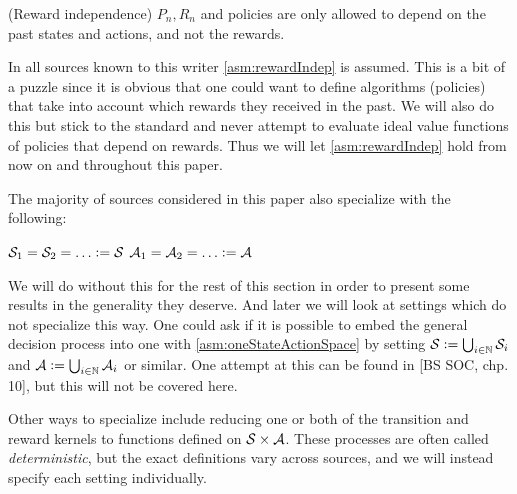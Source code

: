 \begin{asm}(Reward independence)
  $P_n, R_n$ and policies are only allowed to depend on the past
  states and actions, and not the rewards.
  \label{asm:rewardIndep}
\end{asm}

In all sources known to this writer \cref{asm:rewardIndep} is assumed.
This is a bit of a puzzle since it is obvious that one could
want to define algorithms (policies) that take into account which rewards
they received in the past.
We will also do this but stick to the standard and 
never attempt to evaluate ideal value functions of
policies that depend on rewards.
Thus we will let \cref{asm:rewardIndep} hold
from now on and throughout this paper.

The majority of sources considered in this paper also specialize
with the following:
\begin{asm}
  $\Cal{S}_1 = \Cal{S}_2 = \dots \defeq \Cal{S}$
  $\Cal{A}_1 = \Cal{A}_2 = \dots \defeq \Cal{A}$
  \label{asm:oneStateActionSpace}
\end{asm}
We will do without this for the rest of this section in order to
present some results in the generality they deserve.
And later we will look at settings which do not specialize this way.
One could ask if it is possible to embed the general decision process into one
with \cref{asm:oneStateActionSpace} by setting
$\mathcal{S} \vcentcolon= \bigcup_{i\in\mathbb{N}} \mathcal{S}_i$ and
$\mathcal{A} \vcentcolon= \bigcup_{i\in\mathbb{N}} \mathcal{A}_i$ or similar.
One attempt at this can be found in [BS SOC, chp. 10],
but this will not be covered here. %

Other ways to specialize include reducing one or both of the
transition and reward kernels to functions defined on
$\mathcal{S} \times \mathcal{A}$. These processes are often called
\emph{deterministic}, but the exact definitions vary across sources, and we will
instead specify each setting individually.

